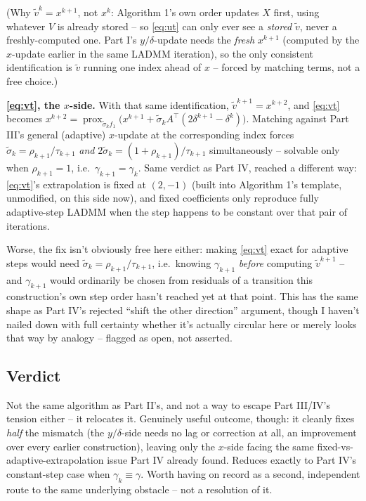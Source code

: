 \documentclass[11pt]{article}
\newcommand{\prox}{\operatorname{prox}}
\begin{document}
(Why $\tilde v^k=x^{k+1}$, not $x^k$: Algorithm 1's own order updates $X$ first, using
whatever $V$ is already stored -- so \eqref{eq:ut} can only ever see a \emph{stored}
$\tilde v$, never a freshly-computed one. Part I's $y/\delta$-update needs the
\emph{fresh} $x^{k+1}$ (computed by the $x$-update earlier in the same LADMM
iteration), so the only consistent identification is $\tilde v$ running one index
ahead of $x$ -- forced by matching terms, not a free choice.)

\textbf{\eqref{eq:vt}, the $x$-side.} With that same identification,
$\tilde v^{k+1}=x^{k+2}$, and \eqref{eq:vt} becomes
$x^{k+2}=\prox_{\tilde\sigma_kf_1}\big(x^{k+1}+\tilde\sigma_kA^\top(2\delta^{k+1}-\delta^k)\big)$.
Matching against Part III's general (adaptive) $x$-update at the corresponding index
forces $\tilde\sigma_k=\rho_{k+1}/\tau_{k+1}$ \emph{and} $2\tilde\sigma_k=(1+\rho_{k+1})/\tau_{k+1}$
simultaneously -- solvable only when $\rho_{k+1}=1$, i.e.\ $\gamma_{k+1}=\gamma_k$. Same
verdict as Part IV, reached a different way: \eqref{eq:vt}'s extrapolation is fixed at
$(2,-1)$ (built into Algorithm 1's template, unmodified, on this side now), and fixed
coefficients only reproduce fully adaptive-step LADMM when the step happens to be
constant over that pair of iterations.

Worse, the fix isn't obviously free here either: making \eqref{eq:vt} exact for
adaptive steps would need $\tilde\sigma_k=\rho_{k+1}/\tau_{k+1}$, i.e.\ knowing
$\gamma_{k+1}$ \emph{before} computing $\tilde v^{k+1}$ -- and $\gamma_{k+1}$ would
ordinarily be chosen from residuals of a transition this construction's own step order
hasn't reached yet at that point. This has the same shape as Part IV's rejected
``shift the other direction'' argument, though I haven't nailed down with full
certainty whether it's actually circular here or merely looks that way by analogy --
flagged as open, not asserted.

\subsection*{Verdict}
Not the same algorithm as Part II's, and not a way to escape Part III/IV's tension
either -- it relocates it. Genuinely useful outcome, though: it cleanly fixes \emph{half}
the mismatch (the $y/\delta$-side needs no lag or correction at all, an improvement
over every earlier construction), leaving only the $x$-side facing the same
fixed-vs-adaptive-extrapolation issue Part IV already found. Reduces exactly to Part
IV's constant-step case when $\gamma_k\equiv\gamma$. Worth having on record as a second,
independent route to the same underlying obstacle -- not a resolution of it.
\end{document}
